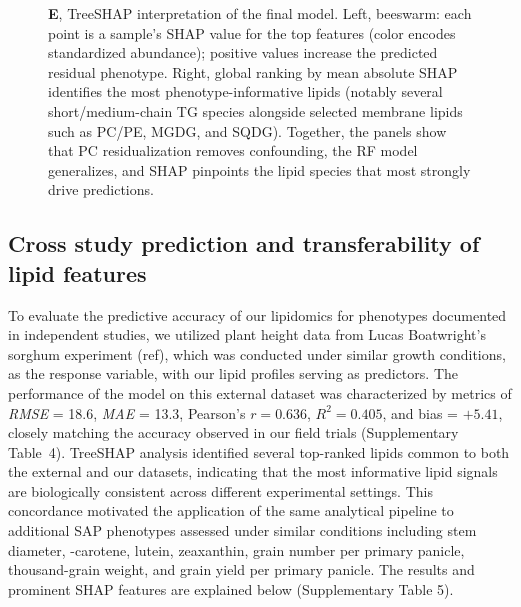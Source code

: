 \documentclass[10pt,letterpaper]{article}
\begin{document}
\begin{itemize}
\begin{figure}[htbp]
{  \textbf{E}, TreeSHAP interpretation of the final model. Left, beeswarm: each point is a sample’s SHAP value for the top features (color encodes standardized abundance); positive values increase the predicted residual phenotype. Right, global ranking by mean absolute SHAP identifies the most phenotype-informative lipids (notably several short/medium-chain TG species alongside selected membrane lipids such as PC/PE, MGDG, and SQDG). 
  Together, the panels show that PC residualization removes confounding, the RF model generalizes, and SHAP pinpoints the lipid species that most strongly drive predictions.}
  \label{fig:fig4_rf_shap}
\end{figure}


\subsection*{Cross study prediction and transferability of lipid features}
To evaluate the predictive accuracy of our lipidomics for phenotypes documented in independent studies, we utilized plant height data from Lucas Boatwright’s sorghum experiment (ref), which was conducted under similar growth conditions, as the response variable, with our lipid profiles serving as predictors. The performance of the model on this external dataset was characterized by metrics of \emph{RMSE} = 18.6, \emph{MAE} = 13.3, Pearson’s $r = 0.636$, $R^2 = 0.405$, and bias = $+5.41$, closely matching the accuracy observed in our field trials (Supplementary Table~4). TreeSHAP analysis identified several top-ranked lipids common to both the external and our datasets, indicating that the most informative lipid signals are biologically consistent across different experimental settings. This concordance motivated the application of the same analytical pipeline to additional SAP phenotypes assessed under similar conditions including stem diameter, \textbeta-carotene, lutein, zeaxanthin, grain number per primary panicle, thousand-grain weight, and grain yield per primary panicle. The results and prominent SHAP features are explained below (Supplementary Table 5).



\end{itemize}
\end{document}

